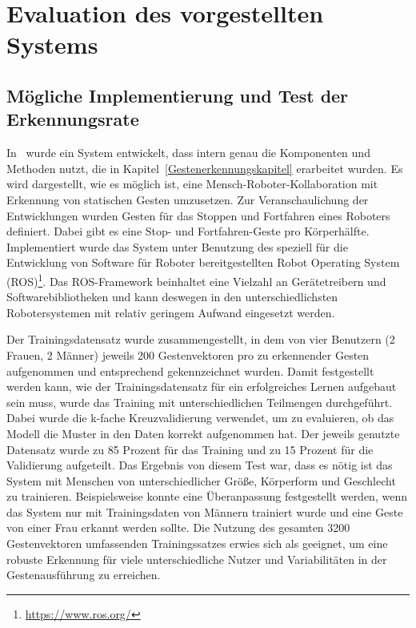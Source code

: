 \chapter{Evaluation des vorgestellten Systems}

\section{Mögliche Implementierung und Test der Erkennungsrate}
In~\cite{flexibleSystem} wurde ein System entwickelt, dass intern genau die Komponenten und Methoden nutzt, die in Kapitel~\ref{Gestenerkennungskapitel} erarbeitet wurden. Es wird dargestellt, wie es möglich ist, eine Mensch-Roboter-Kollaboration mit Erkennung von statischen Gesten umzusetzen. Zur Veranschaulichung der Entwicklungen wurden Gesten für das Stoppen und Fortfahren eines Roboters definiert. Dabei gibt es eine Stop- und Fortfahren-Geste pro Körperhälfte. Implementiert wurde das System unter Benutzung des speziell für die Entwicklung von Software für Roboter bereitgestellten Robot Operating System (ROS)\footnote{\url{https://www.ros.org/}}. Das ROS-Framework beinhaltet eine Vielzahl an Gerätetreibern und Softwarebibliotheken und kann deswegen in den unterschiedlichsten Robotersystemen mit relativ geringem Aufwand eingesetzt werden. 

Der Trainingsdatensatz wurde zusammengestellt, in dem von vier Benutzern (2 Frauen, 2 Männer) jeweils 200 Gestenvektoren pro zu erkennender Gesten aufgenommen und entsprechend gekennzeichnet wurden. Damit festgestellt werden kann, wie der Trainingsdatensatz für ein erfolgreiches Lernen aufgebaut sein muss, wurde das Training mit unterschiedlichen Teilmengen durchgeführt. Dabei wurde die k-fache Kreuzvalidierung verwendet, um zu evaluieren, ob das Modell die Muster in den Daten korrekt aufgenommen hat. Der jeweils genutzte Datensatz wurde zu 85 Prozent für das Training und zu 15 Prozent für die Validierung aufgeteilt. Das Ergebnis von diesem Test war, dass es nötig ist das System mit Menschen von unterschiedlicher Größe, Körperform und Geschlecht zu trainieren. Beispielsweise konnte eine Überanpassung festgestellt werden, wenn das System nur mit Trainingsdaten von Männern trainiert wurde und eine Geste von einer Frau erkannt werden sollte. Die Nutzung des gesamten 3200 Gestenvektoren umfassenden Trainingssatzes erwies sich als geeignet, um eine robuste Erkennung für viele unterschiedliche Nutzer und Variabilitäten in der Gestenausführung zu erreichen.~\cite{flexibleSystem}

